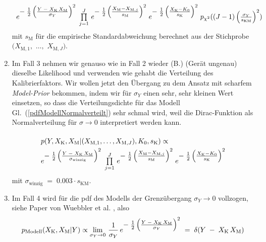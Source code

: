 \begin{enumerate}
\begin{equation}
\begin{array}{l}
e^{\textstyle-\;\frac{1}{2} \left(\frac{ Y \; - \; X_\mathrm{K} \, X_\mathrm{M}}{\sigma_Y} \right)^2}
\; \prod\limits_{j=1}^J \,
e^{\textstyle-\;\frac{1}{2} \left(\frac{ X_\mathrm{M} - X_{\mathrm{M},j} }{s_\mathrm{M}} \right)^2}
\;  e^{\textstyle-\;\frac{1}{2} \left(\frac{X_\mathrm{K} - K_0}{s_\mathrm{K}} \right)^2}
\; p_{\chi^2} ((J-1) \left(\frac{\sigma_Y}{s_\mathrm{KM}}\right)^2)
\end{array}
\label{PosteriorFall2}
\end{equation}
	mit $s_\mathrm{M}$ für die empirische Standardabweichung berechnet aus der Stichprobe
	$(X_{\mathrm{M},1},$ $\dots,$ $X_{\mathrm{M},J})$.
	\item Im Fall 3 nehmen wir genauso wie in Fall 2 wieder (B.) (\glqq Gerät ungenau\grqq)
	dieselbe Likelihood
	und verwenden wie gehabt die Verteilung des Kalibrierfaktors. Wir wollen jetzt den Übergang zu dem
	Ansatz mit scharfem \textsl{Model-Prior} bekommen, indem wir für $\sigma_Y$ einen sehr, sehr
	kleinen Wert einsetzen, so dass die Verteilungsdichte für das Modell
	Gl.~(\ref{pdfModellNormalverteilt}) sehr schmal wird, weil die Dirac-Funktion als
	Normalverteilung für $\sigma \rightarrow 0$ interpretiert werden kann.
\begin{equation}
\arraycolsep=2.0pt\def\arraystretch{2.0}
\begin{array}{l}
p(Y, X_\mathrm{K}, X_\mathrm{M} | (X_{\mathrm{M},1}, \dots, X_{\mathrm{M},J}), K_0, s_\mathrm{K}) \propto \\
e^{\T-\;\frac{1}{2} \left(\frac{ Y \; - \; X_\mathrm{K} \, X_\mathrm{M}}{\sigma_\mathrm{winzig}} \right)^2}
\; \prod\limits_{j=1}^J  \,
e^{\T-\;\frac{1}{2} \left(\frac{ X_\mathrm{M} - X_{\mathrm{M},j} }{s_\mathrm{M}} \right)^2}
\;  e^{\T-\;\frac{1}{2} \left(\frac{X_\mathrm{K} - K_0}{s_\mathrm{K}} \right)^2}
\end{array}
\label{PosteriorFall3}
\end{equation}
	mit $\sigma_\mathrm{winzig} \; = \; 0.003 \cdot s_\mathrm{KM}$.
	\item Im Fall 4 wird für die pdf des Modells der Grenzübergang
	$\sigma_Y \rightarrow 0$ vollzogen, siehe Paper von Wuebbler et al.
	\cite{Wue08}, also
\begin{equation}
p_\mathrm{Modell} (X_\mathrm{K}, X_\mathrm{M} | Y) \propto
\lim\limits_{\sigma_Y \rightarrow 0} \, \frac{1}{\sigma_Y} \,
e^{\textstyle-\;\frac{1}{2} \left(\frac{ Y \; - \; X_\mathrm{K} \, X_\mathrm{M}}{\sigma_Y} \right)^2} \; = \;
\delta(Y \; - \; X_\mathrm{K} \, X_\mathrm{M})
\label{pdfModellDiracPeak}
\end{equation}

\end{enumerate}
